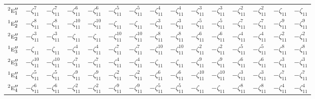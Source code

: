 \documentclass[10pt,a4paper]{article}
\numberwithin{equation}{section}
\newcommand{\irr}[1]{\text{\normalfont\scshape #1}}
\newcommand{\conjpair}[1]{{}^{#1}}
\newcommand{\rootunity}[1]{\zeta_{#1}}
\begin{document}
{\begin{longtable}{@{}lcccccccccccccc@{}}
$\conjpair{2}\irr{e}_{1}''$ & $-\rootunity{11}^{7}$ & $-\rootunity{11}^{7}$ & $-\rootunity{11}^{6}$ & $-\rootunity{11}^{6}$ & $-\rootunity{11}^{5}$ & $-\rootunity{11}^{5}$ & $-\rootunity{11}^{4}$ & $-\rootunity{11}^{4}$ & $-\rootunity{11}^{3}$ & $-\rootunity{11}^{3}$ & $-\rootunity{11}^{2}$ & $-\rootunity{11}^{2}$ & $-\rootunity{11}$ & $-\rootunity{11}$\\
$\conjpair{1}\irr{e}_{2}''$ & $-\rootunity{11}^{8}$ & $-\rootunity{11}^{8}$ & $-\rootunity{11}^{10}$ & $-\rootunity{11}^{10}$ & $-\rootunity{11}$ & $-\rootunity{11}$ & $-\rootunity{11}^{3}$ & $-\rootunity{11}^{3}$ & $-\rootunity{11}^{5}$ & $-\rootunity{11}^{5}$ & $-\rootunity{11}^{7}$ & $-\rootunity{11}^{7}$ & $-\rootunity{11}^{9}$ & $-\rootunity{11}^{9}$\\
$\conjpair{2}\irr{e}_{2}''$ & $-\rootunity{11}^{3}$ & $-\rootunity{11}^{3}$ & $-\rootunity{11}$ & $-\rootunity{11}$ & $-\rootunity{11}^{10}$ & $-\rootunity{11}^{10}$ & $-\rootunity{11}^{8}$ & $-\rootunity{11}^{8}$ & $-\rootunity{11}^{6}$ & $-\rootunity{11}^{6}$ & $-\rootunity{11}^{4}$ & $-\rootunity{11}^{4}$ & $-\rootunity{11}^{2}$ & $-\rootunity{11}^{2}$\\
$\conjpair{1}\irr{e}_{3}''$ & $-\rootunity{11}$ & $-\rootunity{11}$ & $-\rootunity{11}^{4}$ & $-\rootunity{11}^{4}$ & $-\rootunity{11}^{7}$ & $-\rootunity{11}^{7}$ & $-\rootunity{11}^{10}$ & $-\rootunity{11}^{10}$ & $-\rootunity{11}^{2}$ & $-\rootunity{11}^{2}$ & $-\rootunity{11}^{5}$ & $-\rootunity{11}^{5}$ & $-\rootunity{11}^{8}$ & $-\rootunity{11}^{8}$\\
$\conjpair{2}\irr{e}_{3}''$ & $-\rootunity{11}^{10}$ & $-\rootunity{11}^{10}$ & $-\rootunity{11}^{7}$ & $-\rootunity{11}^{7}$ & $-\rootunity{11}^{4}$ & $-\rootunity{11}^{4}$ & $-\rootunity{11}$ & $-\rootunity{11}$ & $-\rootunity{11}^{9}$ & $-\rootunity{11}^{9}$ & $-\rootunity{11}^{6}$ & $-\rootunity{11}^{6}$ & $-\rootunity{11}^{3}$ & $-\rootunity{11}^{3}$\\
$\conjpair{1}\irr{e}_{4}''$ & $-\rootunity{11}^{5}$ & $-\rootunity{11}^{5}$ & $-\rootunity{11}^{9}$ & $-\rootunity{11}^{9}$ & $-\rootunity{11}^{2}$ & $-\rootunity{11}^{2}$ & $-\rootunity{11}^{6}$ & $-\rootunity{11}^{6}$ & $-\rootunity{11}^{10}$ & $-\rootunity{11}^{10}$ & $-\rootunity{11}^{3}$ & $-\rootunity{11}^{3}$ & $-\rootunity{11}^{7}$ & $-\rootunity{11}^{7}$\\
$\conjpair{2}\irr{e}_{4}''$ & $-\rootunity{11}^{6}$ & $-\rootunity{11}^{6}$ & $-\rootunity{11}^{2}$ & $-\rootunity{11}^{2}$ & $-\rootunity{11}^{9}$ & $-\rootunity{11}^{9}$ & $-\rootunity{11}^{5}$ & $-\rootunity{11}^{5}$ & $-\rootunity{11}$ & $-\rootunity{11}$ & $-\rootunity{11}^{8}$ & $-\rootunity{11}^{8}$ & $-\rootunity{11}^{4}$ & $-\rootunity{11}^{4}$\\

\end{longtable}}
\end{document}
